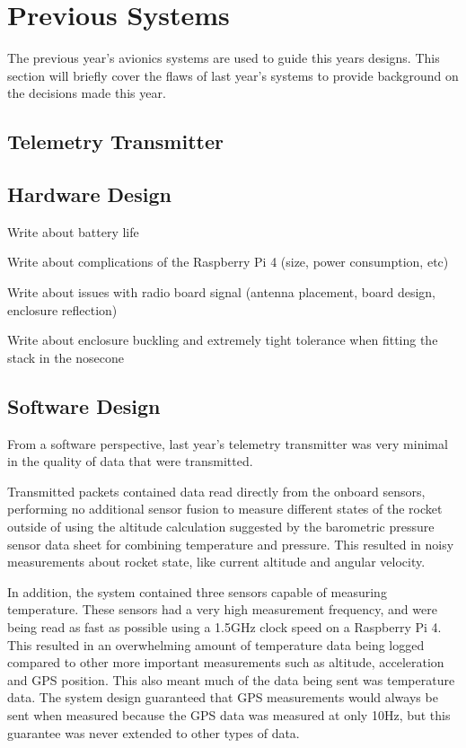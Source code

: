\section{Previous Systems}

The previous year's avionics systems are used to guide this years designs. This section will briefly cover the flaws of
last year's systems to provide background on the decisions made this year.

\subsection{Telemetry Transmitter}

\subsection{Hardware Design}

Write about battery life

Write about complications of the Raspberry Pi 4 (size, power consumption, etc)

Write about issues with radio board signal (antenna placement, board design, enclosure reflection)

Write about enclosure buckling and extremely tight tolerance when fitting the stack in the nosecone

\subsection{Software Design}

From a software perspective, last year's telemetry transmitter was very minimal in the quality of data that were
transmitted.

Transmitted packets contained data read directly from the onboard sensors, performing no additional sensor fusion to
measure different states of the rocket outside of using the altitude calculation suggested by the barometric pressure
sensor data sheet for combining temperature and pressure. This resulted in noisy measurements about rocket state, like
current altitude and angular velocity.

In addition, the system contained three sensors capable of measuring temperature. These sensors had a very high
measurement frequency, and were being read as fast as possible using a 1.5GHz clock speed on a Raspberry Pi 4. This
resulted in an overwhelming amount of temperature data being logged compared to other more important measurements such
as altitude, acceleration and GPS position. This also meant much of the data being sent was temperature data. The system
design guaranteed that GPS measurements would always be sent when measured because the GPS data was measured at only
10Hz, but this guarantee was never extended to other types of data.

